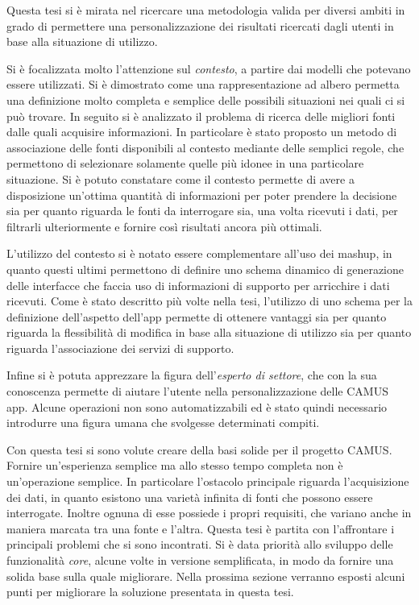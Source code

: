 Questa tesi si è mirata nel ricercare una metodologia valida per diversi ambiti in grado di permettere una personalizzazione dei risultati ricercati dagli utenti in base alla situazione di utilizzo.

Si è focalizzata molto l'attenzione sul \emph{contesto}, a partire dai modelli che potevano essere utilizzati. Si è dimostrato come una rappresentazione ad albero permetta una definizione molto completa e semplice delle possibili situazioni nei quali ci si può trovare. In seguito si è analizzato il problema di ricerca delle migliori fonti dalle quali acquisire informazioni. In particolare è stato proposto un metodo di associazione delle fonti disponibili al contesto mediante delle semplici regole, che permettono di selezionare solamente quelle più idonee in una particolare situazione. Si è potuto constatare come il contesto permette di avere a disposizione un'ottima quantità di informazioni per poter prendere la decisione sia per quanto riguarda le fonti da interrogare sia, una volta ricevuti i dati, per filtrarli ulteriormente e fornire così risultati ancora più ottimali.

L'utilizzo del contesto si è notato essere complementare all'uso dei mashup, in quanto questi ultimi permettono di definire uno schema dinamico di generazione delle interfacce che faccia uso di informazioni di supporto per arricchire i dati ricevuti. Come è stato descritto più volte nella tesi, l'utilizzo di uno schema per la definizione dell'aspetto dell'app permette di ottenere vantaggi sia per quanto riguarda la flessibilità di modifica in base alla situazione di utilizzo sia per quanto riguarda l'associazione dei servizi di supporto.

Infine si è potuta apprezzare la figura dell'\emph{esperto di settore}, che con la sua conoscenza permette di aiutare l'utente nella personalizzazione delle CAMUS app. Alcune operazioni non sono automatizzabili ed è stato quindi necessario introdurre una figura umana che svolgesse determinati compiti.

Con questa tesi si sono volute creare della basi solide per il progetto CAMUS. Fornire un'esperienza semplice ma allo stesso tempo completa non è un'operazione semplice. In particolare l'ostacolo principale riguarda l'acquisizione dei dati, in quanto esistono una varietà infinita di fonti che possono essere interrogate. Inoltre ognuna di esse possiede i propri requisiti, che variano anche in maniera marcata tra una fonte e l'altra. Questa tesi è partita con l'affrontare i principali problemi che si sono incontrati. Si è data priorità allo sviluppo delle funzionalità \emph{core}, alcune volte in versione semplificata, in modo da fornire una solida base sulla quale migliorare. Nella prossima sezione verranno esposti alcuni punti per migliorare la soluzione presentata in questa tesi.

